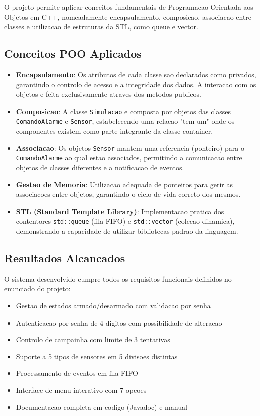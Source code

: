 \documentclass[12pt,a4paper]{article}
\begin{document}
O projeto permite aplicar conceitos fundamentais de Programacao Orientada aos Objetos em C++, nomeadamente encapsulamento, composicao, associacao entre classes e utilizacao de estruturas da STL, como queue e vector.

\subsection{Conceitos POO Aplicados}

\begin{itemize}
    \item \textbf{Encapsulamento}: Os atributos de cada classe sao declarados como privados, garantindo o controlo de acesso e a integridade dos dados. A interacao com os objetos e feita exclusivamente atraves dos metodos publicos.
    
    \item \textbf{Composicao}: A classe \texttt{Simulacao} e composta por objetos das classes \texttt{ComandoAlarme} e \texttt{Sensor}, estabelecendo uma relacao "tem-um" onde os componentes existem como parte integrante da classe container.
    
    \item \textbf{Associacao}: Os objetos \texttt{Sensor} mantem uma referencia (ponteiro) para o \texttt{ComandoAlarme} ao qual estao associados, permitindo a comunicacao entre objetos de classes diferentes e a notificacao de eventos.
    
    \item \textbf{Gestao de Memoria}: Utilizacao adequada de ponteiros para gerir as associacoes entre objetos, garantindo o ciclo de vida correto dos mesmos.
    
    \item \textbf{STL (Standard Template Library)}: Implementacao pratica dos contentores \texttt{std::queue} (fila FIFO) e \texttt{std::vector} (colecao dinamica), demonstrando a capacidade de utilizar bibliotecas padrao da linguagem.
\end{itemize}

\subsection{Resultados Alcancados}

O sistema desenvolvido cumpre todos os requisitos funcionais definidos no enunciado do projeto:

\begin{itemize}
    \item Gestao de estados armado/desarmado com validacao por senha
    \item Autenticacao por senha de 4 digitos com possibilidade de alteracao
    \item Controlo de campainha com limite de 3 tentativas
    \item Suporte a 5 tipos de sensores em 5 divisoes distintas
    \item Processamento de eventos em fila FIFO
    \item Interface de menu interativo com 7 opcoes
    \item Documentacao completa em codigo (Javadoc) e manual
\end{itemize}
\end{document}
